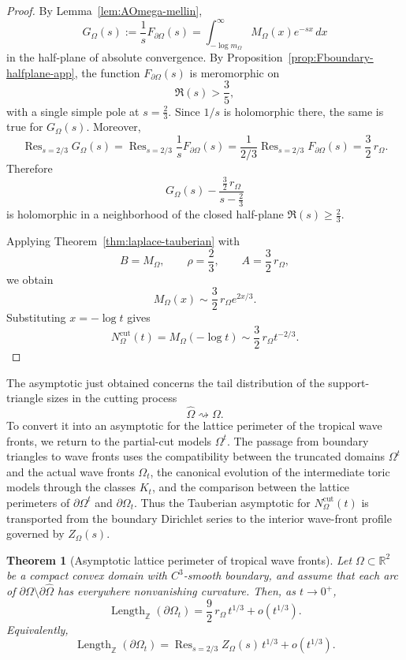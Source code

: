 \documentclass[a4paper,american,11pt]{amsart}
\theoremstyle{plain}
\newtheorem{theorem}{Theorem}[section]
\theoremstyle{definition}
\newcommand{\Z}{\mathbb Z}
\newcommand{\R}{\mathbb R}
\DeclareMathOperator*{\Res}{Res}
\DeclareMathOperator{\Length}{Length}
\begin{document}
\begin{proof}
By Lemma~\ref{lem:AOmega-mellin},
\[
G_\Omega(s):=\frac1sF_{\partial\Omega}(s)
=
\int_{-\log m_\Omega}^{\infty}M_\Omega(x)e^{-sx}\,dx
\]
in the half-plane of absolute convergence.  By
Proposition~\ref{prop:Fboundary-halfplane-app}, the function
\(F_{\partial\Omega}(s)\) is meromorphic on
\[
\Re(s)>\frac35,
\]
with a single simple pole at \(s=\frac23\).  Since \(1/s\) is holomorphic
there, the same is true for \(G_\Omega(s)\).  Moreover,
\[
\Res_{s=2/3}G_\Omega(s)
=
\Res_{s=2/3}\frac1sF_{\partial\Omega}(s)
=
\frac{1}{2/3}\Res_{s=2/3}F_{\partial\Omega}(s)
=
\frac32\,r_\Omega.
\]
Therefore
\[
G_\Omega(s)-\frac{\frac32\,r_\Omega}{s-\frac23}
\]
is holomorphic in a neighborhood of the closed half-plane
\(\Re(s)\ge\frac23\).

Applying Theorem~\ref{thm:laplace-tauberian} with
\[
B=M_\Omega,\qquad
\rho=\frac23,\qquad
A=\frac32\,r_\Omega,
\]
we obtain
\[
M_\Omega(x)\sim \frac32\,r_\Omega e^{2x/3}.
\]
Substituting \(x=-\log t\) gives
\[
N^{\mathrm{cut}}_\Omega(t)
=
M_\Omega(-\log t)
\sim
\frac32\,r_\Omega t^{-2/3}.
\]
\end{proof}

The asymptotic just obtained concerns the tail distribution of the
support-triangle sizes in the cutting process
\[
\widehat\Omega\rightsquigarrow\Omega.
\]
To convert it into an asymptotic for the lattice perimeter of the tropical
wave fronts, we return to the partial-cut models \(\Omega^t\).  The passage
from boundary triangles to wave fronts uses the compatibility between the
truncated domains \(\Omega^t\) and the actual wave fronts \(\Omega_t\), the
canonical evolution of the intermediate toric models through the classes
\(K_t\), and the comparison between the lattice perimeters of
\(\partial\Omega^t\) and \(\partial\Omega_t\).  Thus the Tauberian asymptotic
for \(N^{\mathrm{cut}}_\Omega(t)\) is transported from the boundary
Dirichlet series to the interior wave-front profile governed by \(Z_\Omega(s)\).

\begin{theorem}[Asymptotic lattice perimeter of tropical wave fronts]
\label{thm:twfper-rigorous}
Let \(\Omega\subset\R^2\) be a compact convex domain with \(C^3\)-smooth
boundary, and assume that each arc of
\(\partial\Omega\setminus\partial\widehat\Omega\) has everywhere nonvanishing
curvature.  Then, as \(t\to0^+\),
\[
\Length_{\Z}(\partial\Omega_t)
=
\frac92\,r_\Omega\,t^{1/3}+o(t^{1/3}).
\]
Equivalently,
\[
\Length_{\Z}(\partial\Omega_t)
=
\Res_{s=2/3}Z_\Omega(s)\,t^{1/3}+o(t^{1/3}).
\]
\end{theorem}
\end{document}
